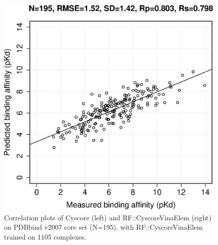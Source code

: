 \documentclass[journal=jacsat,manuscript=article]{achemso}
\begin{document}
\begin{figure}[ht!]
\includegraphics[width=\linewidth]{../rfcyscore/x46/rf/trn-1105-tst-195-yp.eps}
\endminipage
\caption{Correlation plots of Cyscore (left) and RF::CyscoreVinaElem (right) on PDBbind v2007 core set (N=195), with RF::CyscoreVinaElem trained on 1105 complexes.}
\label{fig:tst195}
\end{figure}
\end{document}
